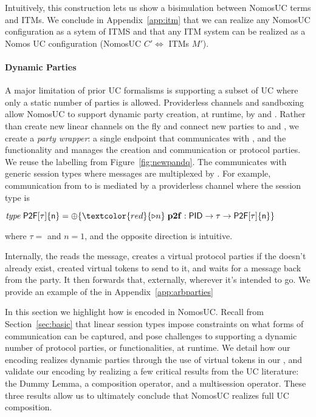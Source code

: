 Intuitively, this construction lets us show a bisimulation between NomosUC terms and ITMs.
We conclude in Appendix~\ref{app:itm} that we can realize any NomosUC configuration as a sytem of ITMS and that any ITM system can be realized as a Nomos UC configuration (NomosUC $C' \Leftrightarrow$ ITMs $M'$).

\paragraph*{\textbf{Dynamic Parties}}
A major limitation of prior UC formalisms is supporting a subset of UC where only a static number of parties is allowed.
Providerless channels and sandboxing allow NomosUC to support dynamic party creation, at runtime, by \Z and \A.
Rather than create new linear channels on the fly and connect new parties to \Z and \A, we create a \emph{party wrapper}: a single endpoint that communicates with \Z, \A and the functionality and manages the creation and communication or protocol parties.
We reuse the labelling from Figure~\ref{fig:newpandq}.
The \partywrapper communicates with generic session types where messages are multiplexed by .
For example, communication from \partywrapper to \Fdb is mediated by a providerless channel where the session type is
\begin{tabbing}
	$\mi{type} \; \m{P2F[\tau]\{n\}} = \ichoice{\textcolor{red}{\paypot{n}} \; \mb{p2f}: \m{PID} \arrow \m{\tau} \arrow \m{P2F[\tau]\{n\}}}$
\end{tabbing}
where $\tau =$  and $n = 1$, and the opposite direction is intuitive. 

Internally, the \partywrapper reads the message, creates a virtual protocol parties if the  doesn't already exist, created virtual tokens to send to it, and waits for a message back from the party. 
It then forwards that, externally, wherever it's intended to go.
We provide an example of the \partywrapper in Appendix~\ref{app:arbparties} 


In this section we highlight how  is encoded in NomosUC.
Recall from Section~\ref{sec:basic} that linear session types impose constraints on what forms of communication can be captured, and pose challenges to supporting 
a dynamic number of protocol parties, or functionalities, at runtime. 
We detail how our encoding realizes dynamic parties through the use of virtual tokens in our \partywrapper,
and validate our encoding by realizing a few critical results from the UC literature: the Dummy Lemma, a composition operator, and a multisession operator. 
These three results allow us to ultimately conclude that NomosUC realizes full UC composition.

